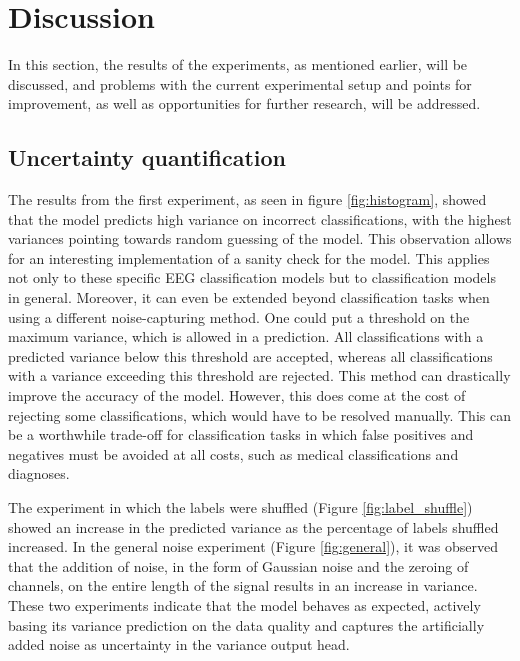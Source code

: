 \section{Discussion}\label{sec:discussion}

In this section, the results of the experiments, as mentioned earlier, will be discussed, and problems with the current experimental setup and points for improvement, as well as opportunities for further research, will be addressed.

\subsection{Uncertainty quantification}

The results from the first experiment, as seen in figure \ref{fig:histogram}, showed that the model predicts high variance on incorrect classifications, with the highest variances pointing towards random guessing of the model. This observation allows for an interesting implementation of a sanity check for the model. This applies not only to these specific EEG classification models but to classification models in general. Moreover, it can even be extended beyond classification tasks when using a different noise-capturing method. One could put a threshold on the maximum variance, which is allowed in a prediction. All classifications with a predicted variance below this threshold are accepted, whereas all classifications with a variance exceeding this threshold are rejected. This method can drastically improve the accuracy of the model. However, this does come at the cost of rejecting some classifications, which would have to be resolved manually. This can be a worthwhile trade-off for classification tasks in which false positives and negatives must be avoided at all costs, such as medical classifications and diagnoses.

The experiment in which the labels were shuffled (Figure \ref{fig:label_shuffle}) showed an increase in the predicted variance as the percentage of labels shuffled increased. In the general noise experiment (Figure \ref{fig:general}), it was observed that the addition of noise, in the form of Gaussian noise and the zeroing of channels, on the entire length of the signal results in an increase in variance. These two experiments indicate that the model behaves as expected, actively basing its variance prediction on the data quality and captures the artificially added noise as uncertainty in the variance output head.

